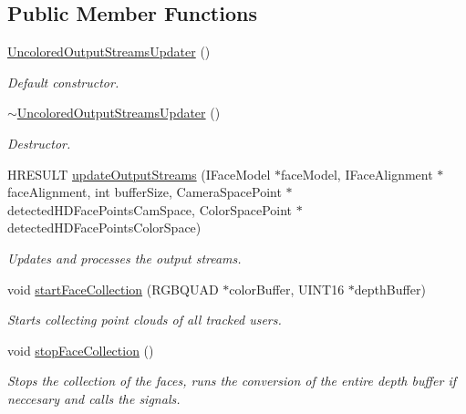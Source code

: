 \subsection*{Public Member Functions}
\begin{DoxyCompactItemize}
\item 
\hypertarget{class_uncolored_output_streams_updater_a64ae7fe4aa062ea1bcffa927d5ba1624}{}\hyperlink{class_uncolored_output_streams_updater_a64ae7fe4aa062ea1bcffa927d5ba1624}{Uncolored\+Output\+Streams\+Updater} ()\label{class_uncolored_output_streams_updater_a64ae7fe4aa062ea1bcffa927d5ba1624}

\begin{DoxyCompactList}\small\item\em Default constructor. \end{DoxyCompactList}\item 
\hypertarget{class_uncolored_output_streams_updater_af3b179fe61b46dd17b43970834135b19}{}\hyperlink{class_uncolored_output_streams_updater_af3b179fe61b46dd17b43970834135b19}{$\sim$\+Uncolored\+Output\+Streams\+Updater} ()\label{class_uncolored_output_streams_updater_af3b179fe61b46dd17b43970834135b19}

\begin{DoxyCompactList}\small\item\em Destructor. \end{DoxyCompactList}\item 
H\+R\+E\+S\+U\+L\+T \hyperlink{class_uncolored_output_streams_updater_a0066f3f764858f63d29a72f215f4cf5e}{update\+Output\+Streams} (I\+Face\+Model $\ast$face\+Model, I\+Face\+Alignment $\ast$face\+Alignment, int buffer\+Size, Camera\+Space\+Point $\ast$detected\+H\+D\+Face\+Points\+Cam\+Space, Color\+Space\+Point $\ast$detected\+H\+D\+Face\+Points\+Color\+Space)
\begin{DoxyCompactList}\small\item\em Updates and processes the output streams. \end{DoxyCompactList}\item 
void \hyperlink{class_uncolored_output_streams_updater_ae5b26d31a579242a58b98854ac4bf1b3}{start\+Face\+Collection} (R\+G\+B\+Q\+U\+A\+D $\ast$color\+Buffer, U\+I\+N\+T16 $\ast$depth\+Buffer)
\begin{DoxyCompactList}\small\item\em Starts collecting point clouds of all tracked users. \end{DoxyCompactList}\item 
\hypertarget{class_uncolored_output_streams_updater_aa6ef874cb8e0270f12cb7e110b7064da}{}void \hyperlink{class_uncolored_output_streams_updater_aa6ef874cb8e0270f12cb7e110b7064da}{stop\+Face\+Collection} ()\label{class_uncolored_output_streams_updater_aa6ef874cb8e0270f12cb7e110b7064da}

\begin{DoxyCompactList}\small\item\em Stops the collection of the faces, runs the conversion of the entire depth buffer if neccesary and calls the signals. \end{DoxyCompactList}\end{DoxyCompactItemize}
